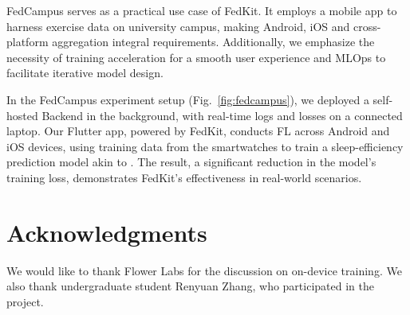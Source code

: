 \documentclass[letterpaper]{article} %
\begin{document}
FedCampus serves as a practical use case of FedKit.
It employs a mobile app to harness exercise data on university campus,
making Android, iOS and cross-platform aggregation integral requirements.
Additionally,
we emphasize the necessity of training acceleration for
a smooth user experience
and MLOps to facilitate iterative model design.

In the FedCampus experiment setup (Fig.~\ref{fig:fedcampus}),
we deployed a self-hosted Backend in the background,
with real-time logs and losses on a connected laptop.
Our Flutter app, powered by FedKit,
conducts FL across Android and iOS devices,
using training data from the smartwatches to
train a sleep-efficiency prediction model
akin to \cite{khoa2022fedmcrnn}.
The result, a significant reduction in the model's training loss,
demonstrates FedKit's effectiveness in real-world scenarios.

\appendix

\section*{Acknowledgments}
We would like to thank Flower Labs for the discussion on on-device training.
We also thank undergraduate student Renyuan Zhang,
who participated in the project.

\bigskip


\end{document}
